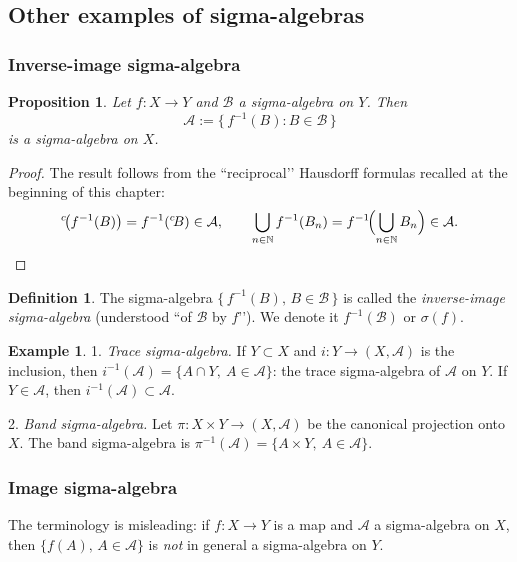 \documentclass[11pt]{article}
\newtheorem{proposition}{Proposition}[section]
\theoremstyle{definition}
\newtheorem{definition}{Definition}[section]
\newtheorem{example}{Example}[section]
\begin{document}
\subsection{Other examples of sigma-algebras}\label{subsec:3.2}

\subsubsection{Inverse-image sigma-algebra}

\begin{proposition}\label{prop:preimage}
Let $f:X\to Y$ and $\mathcal B$ a sigma-algebra on $Y$. Then
\[
\mathcal A:=\{\,f^{-1}(B): B\in\mathcal B\,\}
\]
is a sigma-algebra on $X$.
\end{proposition}

\begin{proof}
The result follows from the “reciprocal’’ Hausdorff formulas recalled at the beginning of this chapter:
\[
{}^{c}\!\bigl(f^{-1}(B)\bigr)= f^{-1}({}^{c}\!B)\in\mathcal A,
\qquad
\bigcup_{n\in\mathbb N} f^{-1}(B_n)= f^{-1}\!\Bigl(\bigcup_{n\in\mathbb N} B_n\Bigr)\in\mathcal A.
\]

\end{proof}

\begin{definition}
The sigma-algebra $\{\,f^{-1}(B),\, B\in\mathcal B\,\}$ is called the \emph{inverse-image sigma-algebra} (understood “of $\mathcal B$ by $f$’’). We denote it $f^{-1}(\mathcal B)$ or $\sigma(f)$.
\end{definition}

\begin{example}
1. \emph{Trace sigma-algebra.} If $Y\subset X$ and $i:Y\to(X,\mathcal A)$ is the inclusion, then $i^{-1}(\mathcal A)=\{A\cap Y,\ A\in\mathcal A\}$: the trace sigma-algebra of $\mathcal A$ on $Y$. If $Y\in\mathcal A$, then $i^{-1}(\mathcal A)\subset\mathcal A$.

2. \emph{Band sigma-algebra.} Let $\pi:X\times Y\to (X,\mathcal A)$ be the canonical projection onto $X$. The band sigma-algebra is $\pi^{-1}(\mathcal A)=\{A\times Y,\ A\in\mathcal A\}$.
\end{example}

\subsubsection{Image sigma-algebra}

The terminology is misleading: if $f:X\to Y$ is a map and $\mathcal A$ a sigma-algebra on $X$, then $\{f(A),\, A\in\mathcal A\}$ is \emph{not} in general a sigma-algebra on $Y$.
\end{document}
